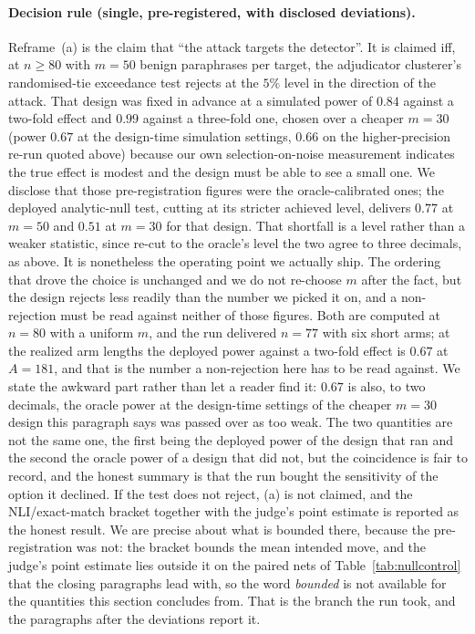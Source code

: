 \paragraph{Decision rule (single, pre-registered, with disclosed deviations).}
Reframe~(a) is the claim that ``the attack targets the detector''. It is claimed iff, at
$n{\geq}80$ with $m{=}50$ benign paraphrases per target, the adjudicator clusterer's
randomised-tie exceedance test rejects at the $5\%$ level in the direction of the attack. That design was
fixed in advance at a simulated power of $0.84$ against a two-fold effect and $0.99$ against
a three-fold one, chosen over a cheaper $m{=}30$ (power $0.67$ at the design-time
simulation settings, $0.66$ on the higher-precision re-run quoted above) because our own
selection-on-noise measurement indicates the true effect is modest and the design must be
able to see a small one. We disclose that those pre-registration figures were the
oracle-calibrated ones; the deployed analytic-null test, cutting at its stricter achieved
level, delivers $0.77$ at $m{=}50$ and $0.51$ at $m{=}30$ for that design. That shortfall is a level rather
than a weaker statistic, since re-cut to the oracle's level the two agree to three decimals,
as above. It is nonetheless the operating point we actually ship. The ordering that drove the choice
is unchanged and we do not re-choose $m$ after the fact, but the design rejects less
readily than the number we picked it on, and
a non-rejection must be read against neither of those figures. Both are computed at $n{=}80$
with a uniform $m$, and the run delivered $n{=}77$ with six short arms; at the realized arm
lengths the deployed power against a two-fold effect is $0.67$ at $A{=}181$, and that is the
number a non-rejection here has to be read against. We state the awkward part rather than let a
reader find it: $0.67$ is also, to two decimals, the oracle power at the design-time settings
of the cheaper $m{=}30$ design this paragraph says was passed over as too weak. The two
quantities are not the same one, the first being the deployed power of the design that ran
and the second the oracle power of a design that did not, but the coincidence is fair to
record, and the honest summary is that the run bought the sensitivity of the option it
declined. If the test does not reject, (a) is not claimed, and the
NLI/exact-match bracket together with the judge's point estimate is reported as the honest
result. We are precise about what is bounded there, because the pre-registration was not: the
bracket bounds the mean intended move, and the judge's point estimate lies outside it on the
paired nets of Table~\ref{tab:nullcontrol} that the closing paragraphs lead with, so the word
\emph{bounded} is not available for the quantities this section concludes from. That is the branch the run took, and
the paragraphs after the deviations report it.

